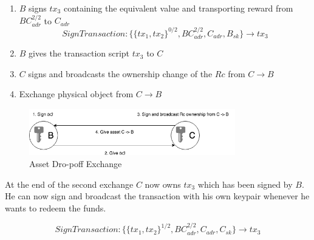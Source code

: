 \begin{enumerate}
  \item $B$ signs $tx_3$ containing the equivalent value and transporting reward from $BC_{adr}^{2/2}$ to $C_{adr}$
  \[SignTransaction \colon \{\{tx_1, tx_2\}^{0/2}, BC_{adr}^{2/2}, C_{adr}, B_{sk}\} \rightarrow tx_3\]
  \item $B$ gives the transaction script $tx_3$ to $C$
  \item $C$ signs and broadcasts the ownership change of the $Rc$ from $C\rightarrow B$
  \item Exchange physical object from $C\rightarrow B$
\end{enumerate}

\begin{figure}[h]
\centering
\includegraphics[width=0.8\textwidth]{images/exchange_02.png}
\caption{Asset Dro-poff Exchange}
\label{fig:3 drop-off exchange}
\end{figure}

At the end of the second exchange $C$ now owns $tx_3$ which has been signed by $B$. He can now sign and broadcast the transaction with his own keypair whenever he wants to redeem the funds.

\[SignTransaction \colon \{\{tx_1, tx_2\}^{1/2}, BC_{adr}^{2/2}, C_{adr}, C_{sk}\} \rightarrow tx_3\]
